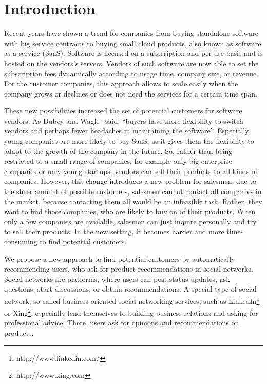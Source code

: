 
\section{Introduction}
\label{sec:introduction}

Recent years have shown a trend for companies from buying standalone software with big service contracts to buying small cloud products, also known as software as a service (SaaS).
Software is licensed on a subscription and per-use basis and is hosted on the vendors's servers.
Vendors of such software are now able to set the subscription fees dynamically according to usage time, company size, or revenue.
For the customer companies, this approach allows to scale easily when the company grows or declines or does not need the services for a certain time span.

These new possibilities increased the set of potential customers for software vendors.
As Dubey and Wagle~\cite{dubey2007delivering} said, ``buyers have more flexibility to switch vendors and perhaps fewer headaches in maintaining the software''.
Especially young companies are more likely to buy SaaS, as it gives them the flexibility to adapt to the growth of the company in the future.
So, rather than being restricted to a small range of companies, for example only big enterprise companies or only young startups, vendors can sell their products to all kinds of companies.
However, this change introduces a new problem for salesmen: due to the sheer amount of possible customers, salesmen cannot contact all companies in the market, because contacting them all would be an infeasible task.
Rather, they want to find those companies, who are likely to buy on of their products.
When only a few companies are available, salesmen can just inquire personally and try to sell their products.
In the new setting, it becomes harder and more time-consuming to find potential customers.

We propose a new approach to find potential customers by automatically recommending users, who ask for product recommendations in social networks.
Social networks are platforms, where users can post status updates, ask questions, start discussions, or obtain recommendations.
A special type of social network, so called business-oriented social networking services, such as LinkedIn\footnote{http://www.linkedin.com/} or Xing\footnote{http://www.xing.com}, especially lend themselves to building business relations and asking for professional advice.
There, users ask for opinions and recommendations on products.

